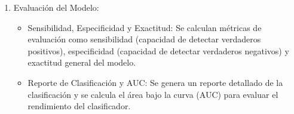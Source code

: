\begin{enumerate}
\begin{itemize}
		\begin{center}
			$P(C_i \mid x) = \frac{P(x \mid C_i) \cdot P(C_i)}{P(x)}$
		\end{center}
		
		donde $P(C_i \mid x)$ es la densidad estimada por KDE para la clase $C_i$, $P(C_i)$ es la probabilidad a priori de la clase $C_i$, y $P(x)$ es la probabilidad total del valor $x$ bajo todas las clases.
		\item 	Asignación de Clase: El valor de DPS se asigna a la clase con la mayor probabilidad posterior. Es decir, se clasifica el valor de DPS en la clase para la cual la probabilidad posterior es mayor.
	\end{itemize}
	
	\item Evaluación del Modelo:
	\begin{itemize}
		\item Sensibilidad, Especificidad y Exactitud: Se calculan métricas de evaluación como sensibilidad (capacidad de detectar verdaderos positivos), especificidad (capacidad de detectar verdaderos negativos) y exactitud general del modelo.
		\item Reporte de Clasificación y AUC: Se genera un reporte detallado de la clasificación y se calcula el área bajo la curva (AUC) para evaluar el rendimiento del clasificador.
	\end{itemize}
	
	
\end{enumerate}

